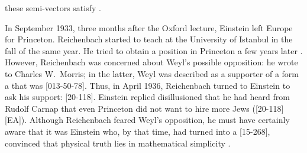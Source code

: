 \documentclass[draft]{article}
\begin{document}
these semi-vectors satisfy \citep[168]{Einstein1933}.

In September 1933, three months after the Oxford lecture, Einstein left Europe for Princeton. Reichenbach started to teach at the University of Istanbul in the fall of the same year. He tried to obtain a position in Princeton a few years later \citep{Verhaegh2020a}. However, Reichenbach was concerned about Weyl's possible opposition:  he wrote to Charles W.\ Morris; in the latter, Weyl was described as a supporter of a form a  that was  [013-50-78].  Thus, in April 1936, Reichenbach turned to Einstein to ask his support:  [20-118]. Einstein replied disillusioned that he had heard from Rudolf Carnap that even Princeton did not want to hire more Jews ([20-118][EA]). Although Reichenbach feared Weyl's opposition, he must have certainly aware that it was Einstein who, by that time, had turned into a  [15-268], convinced that physical truth lies in mathematical simplicity \citep{Ryckman2014}.  





\end{document}

